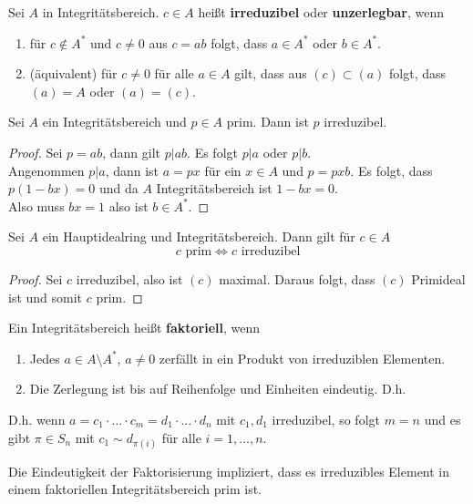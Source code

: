 	\begin{definition}
		Sei $A$ in Integritätsbereich. $c\in A$ heißt \textbf{irreduzibel} oder \textbf{unzerlegbar}, wenn
		\begin{enumerate}
			\item für $c\notin A^*$ und $c\neq 0$ aus $c=ab$ folgt, dass $a\in A^*$ oder $b\in A^*$.
			\item (äquivalent) für $c\neq 0$ für alle $a\in A$ gilt, dass aus $(c)\subset(a)$ folgt, dass $(a)=A$ oder $(a)=(c)$.
		\end{enumerate}
	\end{definition}

	\begin{satz}
		Sei $A$ ein Integritätsbereich und $p\in A$ prim. Dann ist $p$ irreduzibel.
	\end{satz}
	\begin{proof}
		Sei $p=ab$, dann gilt $p|ab$. Es folgt $p|a$ oder $p|b$.\\
		Angenommen $p|a$, dann ist $a=px$ für ein $x\in A$ und $p=pxb$. Es folgt, dass $p(1-bx)=0$ und da $A$ Integritätsbereich ist $1-bx=0$.\\
		Also muss $bx=1$ also ist $b\in A^*$.
	\end{proof}

	\begin{satz}
		Sei $A$ ein Hauptidealring und Integritätsbereich. Dann gilt für $c\in A$
		\[\text{$c$ prim}\Leftrightarrow\text{$c$ irreduzibel}\]
	\end{satz}
	\begin{proof}
		Sei $c$ irreduzibel, also ist $(c)$ maximal. Daraus folgt, dass $(c)$ Primideal ist und somit $c$ prim.
	\end{proof}

	\begin{definition}
		Ein Integritätsbereich heißt \textbf{faktoriell}, wenn
		\begin{enumerate}
			\item Jedes $a\in A\setminus A^*$, $a\neq 0$ zerfällt in ein Produkt von irreduziblen Elementen.
			\item Die Zerlegung ist bis auf Reihenfolge und Einheiten eindeutig. D.h.
		\end{enumerate}
		D.h. wenn $a=c_1\cdot ...\cdot c_m=d_1\cdot...\cdot d_n$ mit $c_1,d_1$ irreduzibel, so folgt $m=n$ und es gibt $\pi\in S_n$ mit $c_1\sim d_{\pi(i)}$ für alle $i=1,...,n$.
	\end{definition}

	\begin{bem}
		Die Eindeutigkeit der Faktorisierung impliziert, dass es irreduzibles Element in einem faktoriellen Integritätsbereich prim ist.
	\end{bem}

